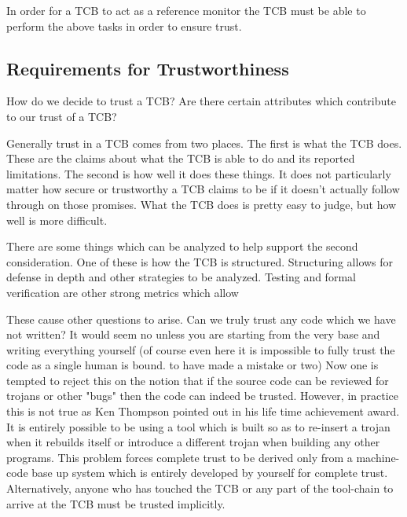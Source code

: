    In order for a TCB to act as a reference monitor the TCB must be able to perform the above tasks in order to ensure trust.

    \cite{cs6238_Ahamad}

  \subsection{Requirements for Trustworthiness}
  \label{ssec:reqs_for_trustworthiness}

    How do we decide to trust a TCB?
    Are there certain attributes which contribute to our trust of a TCB?

    Generally trust in a TCB comes from two places.
    The first is what the TCB does.
    These are the claims about what the TCB is able to do and its reported limitations.
    The second is how well it does these things.
    It does not particularly matter how secure or trustworthy a TCB claims to be if
      it doesn't actually follow through on those promises.
    What the TCB does is pretty easy to judge, but how well is more difficult.

    There are some things which can be analyzed to help support the second consideration.
    One of these is how the TCB is structured.
    Structuring allows for defense in depth and other strategies to be analyzed.
    Testing and formal verification are other strong metrics which allow 

    \cite{cs6238_Ahamad}

    These cause other questions to arise.
    Can we truly trust any code which we have not written? 
    It would seem no unless you are starting from the very base and writing everything yourself
      (of course even here it is impossible to fully trust the code as a single human is bound.
      to have made a mistake or two)
    Now one is tempted to reject this on the notion that if the source code can be reviewed for
      trojans or other "bugs" then the code can indeed be trusted.
    However, in practice this is not true as Ken Thompson pointed out in his life time achievement award.
    It is entirely possible to be using a tool which is built so as to re-insert a trojan when it rebuilds
      itself or introduce a different trojan when building any other programs. 
    This problem forces complete trust to be derived only from a machine-code base up system which is entirely
      developed by yourself for complete trust.
    Alternatively, anyone who has touched the TCB or any part of the tool-chain to arrive at the TCB must be
      trusted implicitly.
    \cite{thompson1983reflections}

